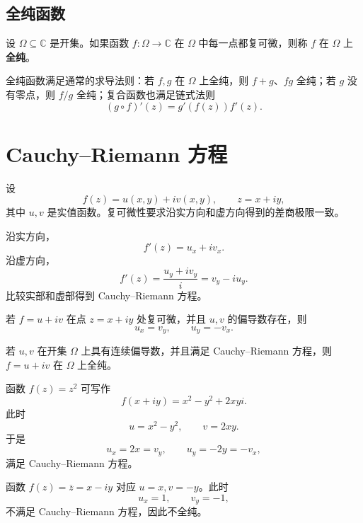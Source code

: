 \subsection{全纯函数}

\begin{definition}[全纯函数]
设 $\Omega\subseteq\mathbb{C}$ 是开集。如果函数 $f:\Omega\to\mathbb{C}$ 在 $\Omega$ 中每一点都复可微，则称 $f$ 在 $\Omega$ 上\textbf{全纯}。
\end{definition}

\begin{proposition}[求导法则]
全纯函数满足通常的求导法则：若 $f,g$ 在 $\Omega$ 上全纯，则 $f+g$、$fg$ 全纯；若 $g$ 没有零点，则 $f/g$ 全纯；复合函数也满足链式法则
\[
    (g\circ f)'(z)=g'(f(z))f'(z).
\]
\end{proposition}

\section{Cauchy--Riemann 方程}

设
\[
    f(z)=u(x,y)+iv(x,y),
    \qquad z=x+iy,
\]
其中 $u,v$ 是实值函数。复可微性要求沿实方向和虚方向得到的差商极限一致。

沿实方向，
\[
    f'(z)=u_x+iv_x.
\]
沿虚方向，
\[
    f'(z)=\frac{u_y+iv_y}{i}=v_y-iu_y.
\]
比较实部和虚部得到 Cauchy--Riemann 方程。

\begin{theorem}
若 $f=u+iv$ 在点 $z=x+iy$ 处复可微，并且 $u,v$ 的偏导数存在，则
\[
    u_x=v_y,
    \qquad
    u_y=-v_x.
\]
\end{theorem}

\begin{theorem}[充分条件]
若 $u,v$ 在开集 $\Omega$ 上具有连续偏导数，并且满足 Cauchy--Riemann 方程，则 $f=u+iv$ 在 $\Omega$ 上全纯。
\end{theorem}

\begin{example}
函数 $f(z)=z^2$ 可写作
\[
    f(x+iy)=x^2-y^2+2xyi.
\]
此时
\[
    u=x^2-y^2,
    \qquad
    v=2xy.
\]
于是
\[
    u_x=2x=v_y,
    \qquad
    u_y=-2y=-v_x,
\]
满足 Cauchy--Riemann 方程。
\end{example}

\begin{example}
函数 $f(z)=\overline z=x-iy$ 对应 $u=x,v=-y$。此时
\[
    u_x=1,
    \qquad
    v_y=-1,
\]
不满足 Cauchy--Riemann 方程，因此不全纯。
\end{example}

